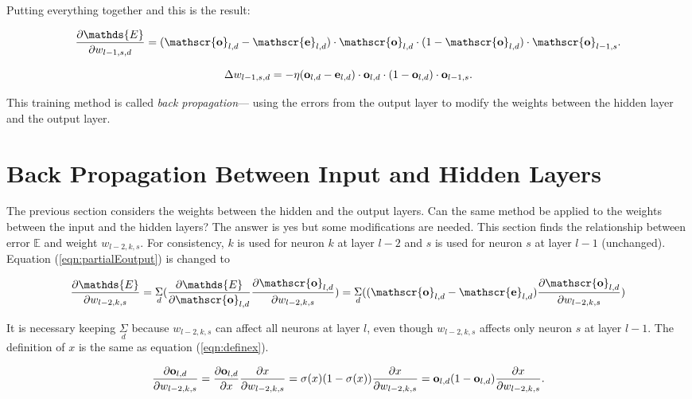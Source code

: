 Putting everything together and this is the result:

\begin{equation}
\frac{\partial \mathds{E}}{\partial w_{l-1, s, d}}
= (\mathscr{\bf o}_{l, d} -   \mathscr{\bf e} _{l, d}) \cdot \mathscr{\bf o}_{l, d} \cdot (1 -
\mathscr{\bf o}_{l, d} ) \cdot  \mathscr{\bf o}_{l-1, s}.
\end{equation}

\begin{equation}
\Delta w_{l-1, s,d} = - \eta (\mathscr{\bf o}_{l, d} -   \mathscr{\bf e} _{l, d}) \cdot \mathscr{\bf o}_{l, d} \cdot (1 -
\mathscr{\bf o}_{l, d} ) \cdot  \mathscr{\bf o}_{l-1, s}.
\end{equation}

This training method is called {\it back propagation}--- using the errors from the
output layer to modify the weights between the hidden layer and the
output layer.  

\section{Back Propagation Between Input and Hidden  Layers}

The previous section considers the weights between the hidden and the
output layers.  Can the same method be applied to the weights between
the input and the hidden layers? The answer is yes but some
modifications are needed.   This section finds the
relationship between error $\mathds{E}$ and weight $w_{l-2, k, s}$.
For consistency, $k$ is used for neuron $k$ at layer $l-2$ and $s$ is
used for neuron $s$ at layer $l-1$ (unchanged).  Equation
(\ref{eqn:partialEoutput}) is changed to

\begin{equation}
\frac{\partial \mathds{E}}{\partial w_{l-2,  k, s}}
= \underset{d}{\Sigma} (\frac{\partial \mathds{E}} {\partial \mathscr{\bf o}_{l, d}} \frac{\partial
\mathscr{\bf o}_{l, d}}{\partial w_{l-2,  k, s}})
= \underset{d}{\Sigma} ((\mathscr{\bf o}_{l, d} -   \mathscr{\bf e} _{l, d}) \frac{\partial
\mathscr{\bf o}_{l, d}}{\partial w_{l-2,  k, s}})
\end{equation}

It is necessary keeping $\underset{d}{\Sigma}$ because $w_{l-2, k, s}$
can affect all neurons at layer $l$, even though $w_{l-2, k, s}$
affects only neuron $s$ at layer $l-1$.
The definition of $x$ is the same as equation (\ref{eqn:definex}).

\begin{equation}
\frac{\partial
\mathscr{\bf o}_{l, d}}{\partial w_{l-2,  k, s}} = \frac{\partial \mathscr{\bf o}_{l, d}} {\partial x}
 \frac{\partial x} {\partial w_{l-2, k, s}} = \sigma(x) (1
 - \sigma(x)) \frac{\partial x} {\partial w_{l-2, k, s}}
 = \mathscr{\bf o}_{l, d} (1 - \mathscr{\bf o}_{l, d}) \frac{\partial
 x} {\partial w_{l-2, k, s}}.
\end{equation}

